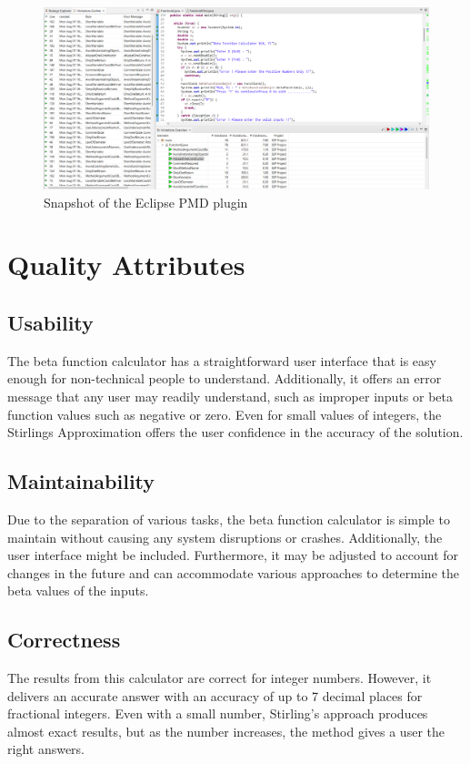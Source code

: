 \documentclass[12pt,a4paper]{report}
\begin{document}
\begin{figure}[h]
    \centering
    \begin{center}
    \includegraphics[width=1.0\linewidth]{Images/PMD_plugin_violations.png}    
    \end{center}
    \caption{Snapshot of the Eclipse PMD plugin}
    \label{fig:Eclipse PMD Plugin}
\end{figure}

\newpage

\section{Quality Attributes}
\subsection{Usability}
The beta function calculator has a straightforward user interface that is easy enough for non-technical people to understand. Additionally, it offers an error message that any user may readily understand, such as improper inputs or beta function values such as negative or zero. Even for small values of integers, the Stirlings Approximation offers the user confidence in the accuracy of the solution.
\subsection{Maintainability}
Due to the separation of various tasks, the beta function calculator is simple to maintain without causing any system disruptions or crashes. Additionally, the user interface might be included. Furthermore, it may be adjusted to account for changes in the future and can accommodate various approaches to determine the beta values of the inputs.
\subsection{Correctness}
The results from this calculator are correct for integer numbers. However, it delivers an accurate answer with an accuracy of up to 7 decimal places for fractional integers. Even with a small number, Stirling's approach produces almost exact results, but as the number increases, the method gives a user the right answers.
\end{document}
